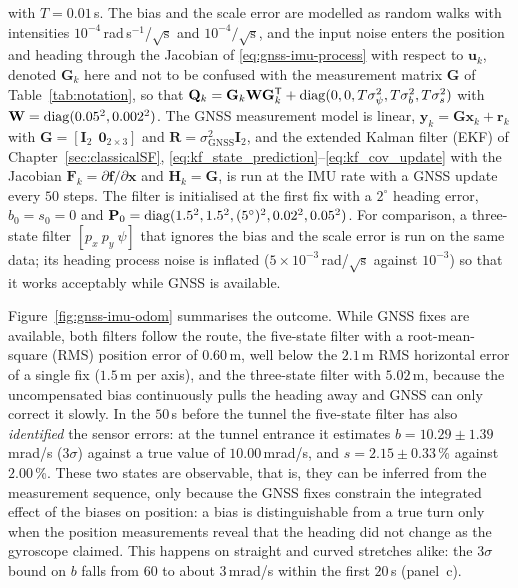 \begin{example}
with $T=0.01$\,s. The bias and the scale error are modelled as random walks with intensities $10^{-4}$\,rad\,s$^{-1}$/$\sqrt{\mathrm{s}}$ and $10^{-4}/\sqrt{\mathrm{s}}$, and the input noise enters the position and heading through the Jacobian of \eqref{eq:gnss-imu-process} with respect to $\mathbf{u}_{k}$, denoted $\mathbf{G}_{k}$ here and not to be confused with the measurement matrix $\mathbf{G}$ of Table~\ref{tab:notation}, so that $\mathbf{Q}_{k}=\mathbf{G}_{k}\mathbf{W}\mathbf{G}_{k}^{\mathsf T}+\operatorname{diag}(0,0,T\sigma_{\psi}^{2},T\sigma_{b}^{2},T\sigma_{s}^{2})$ with $\mathbf{W}=\operatorname{diag}(0.05^{2},0.002^{2})$. The GNSS measurement model is linear, $\mathbf{y}_{k}=\mathbf{G}\mathbf{x}_{k}+\mathbf{r}_{k}$ with $\mathbf{G}=[\mathbf{I}_{2}\ \ \mathbf{0}_{2\times3}]$ and $\mathbf{R}=\sigma_{\mathrm{GNSS}}^{2}\mathbf{I}_{2}$, and the extended Kalman filter (EKF) of Chapter~\ref{sec:classicalSF}, \eqref{eq:kf_state_prediction}--\eqref{eq:kf_cov_update} with the Jacobian $\mathbf{F}_{k}=\partial\mathbf{f}/\partial\mathbf{x}$ and $\mathbf{H}_{k}=\mathbf{G}$, is run at the IMU rate with a GNSS update every $50$ steps. The filter is initialised at the first fix with a $2^{\circ}$ heading error, $b_{0}=s_{0}=0$ and $\mathbf{P}_{0}=\operatorname{diag}(1.5^{2},1.5^{2},(5^{\circ})^{2},0.02^{2},0.05^{2})$. For comparison, a three-state filter $[p_{x}\ p_{y}\ \psi]$ that ignores the bias and the scale error is run on the same data; its heading process noise is inflated ($5\times10^{-3}$\,rad/$\sqrt{\mathrm{s}}$ against $10^{-3}$) so that it works acceptably while GNSS is available.

Figure~\ref{fig:gnss-imu-odom} summarises the outcome. While GNSS fixes are available, both filters follow the route, the five-state filter with a root-mean-square (RMS) position error of $0.60$\,m, well below the $2.1$\,m RMS horizontal error of a single fix ($1.5$\,m per axis), and the three-state filter with $5.02$\,m, because the uncompensated bias continuously pulls the heading away and GNSS can only correct it slowly. In the $50$\,s before the tunnel the five-state filter has also \emph{identified} the sensor errors: at the tunnel entrance it estimates $b=10.29\pm1.39$\,mrad/s ($3\sigma$) against a true value of $10.00$\,mrad/s, and $s=2.15\pm0.33$\,\% against $2.00$\,\%. These two states are observable, that is, they can be inferred from the measurement sequence, only because the GNSS fixes constrain the integrated effect of the biases on position: a bias is distinguishable from a true turn only when the position measurements reveal that the heading did not change as the gyroscope claimed. This happens on straight and curved stretches alike: the $3\sigma$ bound on $b$ falls from $60$ to about $3$\,mrad/s within the first $20$\,s (panel~c).


\end{example}
